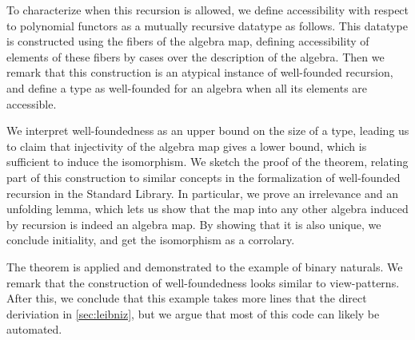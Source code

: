 \documentclass[10pt]{article}
\theoremstyle{plain}%
\theoremstyle{definition}
\newcommand{\towrite}[1]{\todo[color=cyan]{#1}}
\begin{document}
To characterize when this recursion is allowed, we define accessibility with respect to polynomial functors as a mutually recursive datatype as follows. This datatype is constructed using the fibers of the algebra map, defining accessibility of elements of these fibers by cases over the description of the algebra. Then we remark that this construction is an atypical instance of well-founded recursion, and define a type as well-founded for an algebra when all its elements are accessible.

We interpret well-foundedness as an upper bound on the size of a type, leading us to claim that injectivity of the algebra map gives a lower bound, which is sufficient to induce the isomorphism. We sketch the proof of the theorem, relating part of this construction to similar concepts in the formalization of well-founded recursion in the Standard Library. In particular, we prove an irrelevance and an unfolding lemma, which lets us show that the map into any other algebra induced by recursion is indeed an algebra map. By showing that it is also unique, we conclude initiality, and get the isomorphism as a corrolary. 

The theorem is applied and demonstrated to the example of binary naturals. We remark that the construction of well-foundedness looks similar to view-patterns. After this, we conclude that this example takes more lines that the direct deriviation in \autoref{sec:leibniz}, but we argue that most of this code can likely be automated.

\towrite{Merge}


\end{document}
